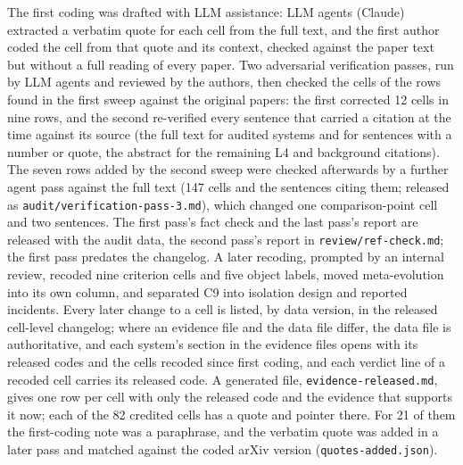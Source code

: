 \documentclass[sigconf,nonacm]{acmart}
\begin{document}
The first coding was drafted with LLM assistance: LLM agents (Claude) extracted a verbatim quote
for each cell from the full text, and the first author coded the cell from that quote and its
context, checked against the paper text but without a full reading of every paper. Two adversarial verification passes,
run by LLM agents and reviewed by the authors, then checked the cells of the rows found in the first sweep
against the original papers: the first corrected 12 cells in nine rows, and the second re-verified every sentence that
carried a citation at the time against its source (the full text for audited systems and for sentences with a number
or quote, the abstract for the remaining L4 and background citations). The seven rows added by the second sweep were
checked afterwards by a further agent pass against the full text (147 cells and the sentences citing them; released as
\texttt{audit/verification-pass-3.md}), which
changed one comparison-point cell and two sentences. The first pass's fact check and the last pass's report are
released with the audit data, the second pass's report in \texttt{review/ref-check.md}; the first pass predates the changelog. A later recoding, prompted by an internal review, recoded nine criterion cells and five
object labels, moved meta-evolution into its own column, and separated C9 into isolation design and reported
incidents. Every later change to a cell is listed, by data version, in the released cell-level changelog;
where an evidence file and the data file differ, the data file is authoritative, and each system's section in the evidence files opens with its released codes and the cells recoded since first coding, and each verdict line of a recoded cell carries its released code. A generated file, \texttt{evidence-released.md}, gives one row per cell with only the released code and the evidence that supports it now; each of the 82 credited cells has a quote and pointer there. For 21 of them the first-coding note was a paraphrase, and the verbatim quote was added in a later pass and matched against the coded arXiv version (\texttt{quotes-added.json}).
\end{document}
